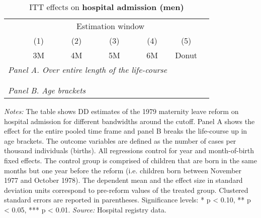  \vspace*{\fill}
 \begin{table}[H] \centering 
 	\begin{threeparttable} \centering \caption{ITT effects on \textbf{hospital admission (men)}}\label{tab: DD_hopsital2_male} {\def\sym#1{\ifmmode^{#1}\else\(^{#1}\)\fi} 
 		\begin{tabular}{l*{6}{c}}
 			\toprule 
 			& \multicolumn{5}{c}{Estimation window} \\ 
 			\cmidrule(lr){2-6}
 			&\multicolumn{1}{c}{(1)}&\multicolumn{1}{c}{(2)}&\multicolumn{1}{c}{(3)}&\multicolumn{1}{c}{(4)}&\multicolumn{1}{c}{(5)}\\
 			&\multicolumn{1}{c}{3M}&\multicolumn{1}{c}{4M}&\multicolumn{1}{c}{5M}&\multicolumn{1}{c}{6M}&\multicolumn{1}{c}{Donut}\\
 				\midrule
 				\multicolumn{5}{l}{\emph{Panel A. Over entire length of the life-course}} \\
 				 \\ \\
 				\multicolumn{5}{l}{\emph{Panel B. Age brackets}} \\
 				    
 				\bottomrule 
 		\end{tabular}}
 		\begin{tablenotes} 
 			\item \scriptsize \emph{Notes:} The table shows DD estimates of the 1979 maternity leave reform on hospital admission for different bandwidths around the cutoff. Panel A shows the effect for the entire pooled time frame and panel B breaks the life-course up in age brackets. The outcome variables are defined as the number of cases per thousand individuals (births). All regressions control for year and month-of-birth fixed effects. The control group is comprised of children that are born in the same months but one year before the reform (i.e. children born between November 1977 and October 1978). The dependent mean and the effect size in standard deviation units correspond to pre-reform values of the treated group. Clustered standard errors are reported in parentheses. \newline Significance levels: * p < 0.10, ** p < 0.05, *** p < 0.01. \newline 	\emph{Source:} Hospital registry data.
 		\end{tablenotes} 
 	\end{threeparttable} 
 \end{table} 
\vspace*{\fill}\clearpage 
